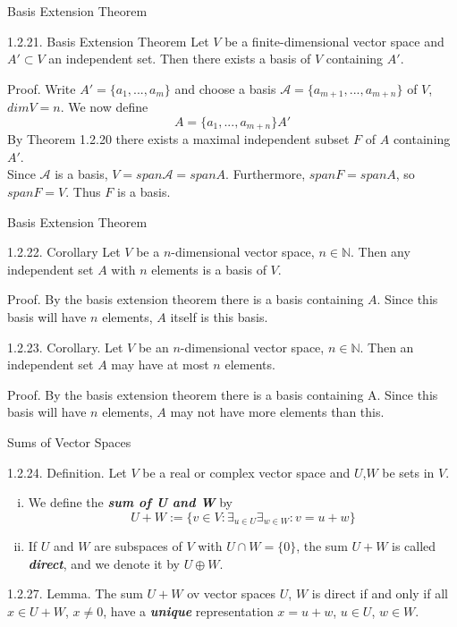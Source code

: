 \documentclass[hyperref={pdfpagelabels=true}]{beamer}
\newcommand{\N}{\mathbb{N}}
\newcommand{\highlightr}[1]{\textcolor[rgb]{1,0.3,0.2}{\emph{\textbf{#1}}}}
\newcommand{\highlightg}[1]{\textcolor[rgb]{0.1,0.5,0.3}{\emph{\textbf{#1}}}}
\newcommand{\<}{\langle}
\renewcommand{\>}{\rangle}
\begin{document}
\begin{frame}{Basis Extension Theorem}
    \begin{block}{1.2.21. Basis Extension Theorem}
        Let $V$ be a finite-dimensional vector space and $A' \subset V$ an independent set. Then there exists a basis of $V$ containing $A'$.
    \end{block}
    \begin{block}{Proof.}
        Write $A' = \{a_1,...,a_m\}$ and choose a basis $\mathcal{A} = \{a_{m+1},...,a_{m+n}\}$ of $V$, $dim V = n$. We now define
        \[A = \{a_{1},...,a_{m+n}\} A'\]
        By Theorem 1.2.20 there exists a maximal independent subset $F$ of $A$ containing $A'$.\\
        Since $\mathcal{A}$ is a basis, $V = span \mathcal{A} = span A$. Furthermore, $span F = span A$, so $span F = V$. Thus $F$ is a basis.
    \end{block}
\end{frame}
\begin{frame}{Basis Extension Theorem}
    \begin{block}{1.2.22. Corollary}
        Let $V$ be a $n$-dimensional vector space, $n \in \N$. Then any independent set $A$ with $n$ elements is a basis of $V$.
    \end{block}
    \begin{block}{Proof.}
        By the basis extension theorem there is a basis containing $A$. Since this basis will have $n$ elements, $A$ itself is this basis.
    \end{block}
    \begin{block}{1.2.23. Corollary.}
        Let $V$ be an $n$-dimensional vector space, $n \in \N$. Then an independent set $A$ may have at most $n$ elements.
    \end{block}
    \begin{block}{Proof.}
        By the basis extension theorem there is a basis containing A. Since this basis will have $n$ elements, $A$ may not have more elements than this.
    \end{block}
\end{frame}
\begin{frame}{Sums of Vector Spaces}
    \begin{block}{1.2.24. Definition.} Let $V$ be a real or complex vector space and $U$,$W$ be sets in $V$.
        \begin{enumerate}[(i)]
            \item We define the \highlightg{sum of U and W} by
            \[U+W:=\{v\in V: \exists_{u \in U} \exists_{w \in W}:v = u+w\}\]
            \item If $U$ and $W$ are subspaces of $V$ with $U \cap W = \{0\}$, the sum $U+W$ is called \highlightg{direct}, and we denote it by $U \oplus W$.
        \end{enumerate} 
    \end{block}
    \begin{block}{1.2.27. Lemma.}
        The sum $U + W$ ov vector spaces $U$, $W$ is direct if and only if all $x \in U + W$, $x \neq 0$, have a \highlightr{unique} representation $x = u + w$, $u \in U$, $w \in W$.
    \end{block}
\end{frame}
\end{document}
